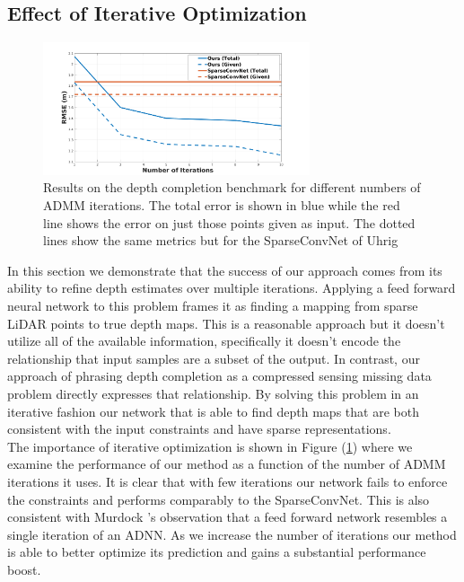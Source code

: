 \subsection{Effect of Iterative Optimization}
\label{sec:effect-iter-optim}
\begin{figure}
  \centering
  \includegraphics[width=0.7\textwidth]{iter_plot}
  \caption{Results on the depth completion benchmark for different numbers of ADMM iterations. The total error is shown in blue while the red line shows the error on just those points given as input. The dotted lines show the same metrics but for the SparseConvNet of Uhrig \etal}
  \label{fig:iterplot}
\end{figure}

In this section we demonstrate that the success of our approach comes from its ability to refine depth estimates over multiple iterations. Applying a feed forward neural network to this problem frames it as finding a mapping from sparse LiDAR points to true depth maps. This is a reasonable approach but it doesn't utilize all of the available information, specifically it doesn't encode the relationship that input samples are a subset of the output. In contrast, our approach of phrasing depth completion as a compressed sensing missing data problem directly expresses that relationship. By solving this problem in an iterative fashion our network that is able to find depth maps that are both consistent with the input constraints and have sparse representations.\\

The importance of iterative optimization is shown in Figure (\ref{fig:iterplot}) where we examine the performance of our method as a function of the number of ADMM iterations it uses. It is clear that with few iterations our network fails to enforce the constraints and performs comparably to the SparseConvNet. This is also consistent with Murdock \etal's observation that a feed forward network resembles a single iteration of an ADNN. As we increase the number of iterations our method is able to better optimize its prediction and gains a substantial performance boost.



